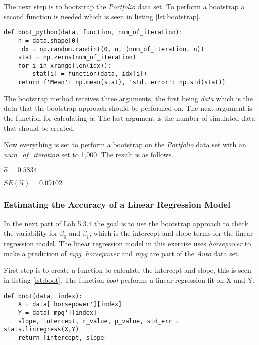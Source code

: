 The next step is to bootstrap the \emph{Portfolio} data set.
To perform a bootstrap a second function is needed which is seen in listing \ref{lst:bootstrap}.

\begin{lstlisting}[caption={Bootstrap function in python}, label=lst:bootstrap, mathescape=true]
def boot_python(data, function, num_of_iteration):
	n = data.shape[0]
	idx = np.random.randint(0, n, (num_of_iteration, n))
	stat = np.zeros(num_of_iteration)
	for i in xrange(len(idx)):
		stat[i] = function(data, idx[i])
	return {'Mean': np.mean(stat), 'std. error': np.std(stat)}
\end{lstlisting}

The bootstrap method receives three arguments, the first being \emph{data} which is the data that the bootstrap approach should be performed on. The next argument is the function for calculating $\alpha$. The last argument is the number of simulated data that should be created.  

Now everything is set to perform a bootstrap on the \emph{Portfolio} data set with an \emph{num\_of\_iteration} set to 1,000. The result is as follows.

\begin{center}
	$\hat{\alpha} = 0.5834$
\end{center}

\begin{center}
	$SE(\hat{\alpha}) = 0.09102$
\end{center}


\subsubsection{Estimating the Accuracy of a Linear Regression Model}

In the next part of Lab 5.3.4 the goal is to use the bootstrap approach to check the variability for $\beta_0$ and $\beta_1$, which is the intercept and slope terms for the linear regression model. The linear regression model in this exercise uses \emph{horsepower} to make a prediction of \emph{mpg}. \emph{horsepower} and \emph{mpg} are part of the \emph{Auto} data set.

First step is to create a function to calculate the intercept and slope, this is seen in listing \ref{lst:boot}. The function \emph{boot} performs a linear regression fit on X and Y. 
\newpage
\begin{lstlisting}[caption={Boot function in python}, label=lst:boot, mathescape=true]
def boot(data, index):
	X = data['horsepower'][index]
	Y = data['mpg'][index]
	slope, intercept, r_value, p_value, std_err = stats.linregress(X,Y)
	return [intercept, slope]
\end{lstlisting}

